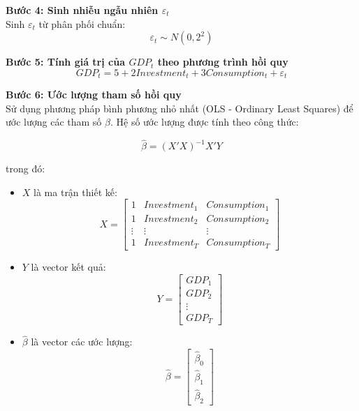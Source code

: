 \textbf{Bước 4: Sinh nhiễu ngẫu nhiên $\varepsilon_t$}  \\
Sinh $\varepsilon_t$ từ phân phối chuẩn:
\begin{equation}
\varepsilon_t \sim N(0, 2^2)
\end{equation}

\textbf{Bước 5: Tính giá trị của $GDP_t$ theo phương trình hồi quy}  \\
\begin{equation}
GDP_t = 5 + 2 Investment_t + 3 Consumption_t + \varepsilon_t
\end{equation}

\textbf{Bước 6: Ước lượng tham số hồi quy}  \\
Sử dụng phương pháp bình phương nhỏ nhất (OLS - Ordinary Least Squares) để ước lượng các tham số $\beta$. Hệ số ước lượng được tính theo công thức:

\begin{equation}
\hat{\beta} = (X'X)^{-1}X'Y
\end{equation}

trong đó:
\begin{itemize}
    \item $X$ là ma trận thiết kế:
    \begin{equation}
    X = \begin{bmatrix} 1 & Investment_1 & Consumption_1 \\ 1 & Investment_2 & Consumption_2 \\ \vdots & \vdots & \vdots \\ 1 & Investment_T & Consumption_T \end{bmatrix}
    \end{equation}
    \item $Y$ là vector kết quả:
    \begin{equation}
    Y = \begin{bmatrix} GDP_1 \\ GDP_2 \\ \vdots \\ GDP_T \end{bmatrix}
    \end{equation}
    \item $\hat{\beta}$ là vector các ước lượng:
    \begin{equation}
    \hat{\beta} = \begin{bmatrix} \hat{\beta}_0 \\ \hat{\beta}_1 \\ \hat{\beta}_2 \end{bmatrix}
    \end{equation}
\end{itemize}

